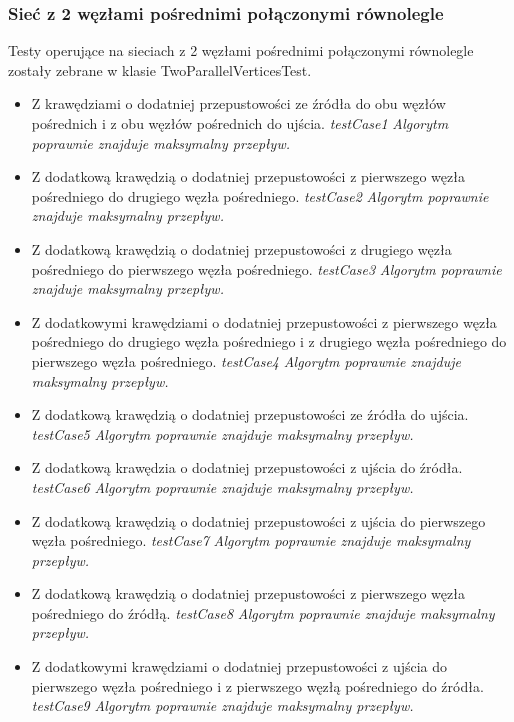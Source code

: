 \subsubsection{Sieć z 2 węzłami pośrednimi połączonymi równolegle}
Testy operujące na sieciach z 2 węzłami pośrednimi połączonymi równolegle zostały
zebrane w klasie TwoParallelVerticesTest.
\begin{itemize}[nosep]
    \item Z krawędziami o dodatniej przepustowości ze źródła do obu węzłów
    pośrednich i z obu węzłów pośrednich do ujścia.
    \emph{testCase1}
    \emph{Algorytm poprawnie znajduje maksymalny przepływ.}

    \item Z dodatkową krawędzią o dodatniej przepustowości z pierwszego węzła
    pośredniego do drugiego węzła pośredniego.
    \emph{testCase2}
    \emph{Algorytm poprawnie znajduje maksymalny przepływ.}

    \item Z dodatkową krawędzią o dodatniej przepustowości z drugiego węzła
    pośredniego do pierwszego węzła pośredniego.
    \emph{testCase3}
    \emph{Algorytm poprawnie znajduje maksymalny przepływ.}

    \item Z dodatkowymi krawędziami o dodatniej przepustowości z pierwszego
    węzła pośredniego do drugiego węzła pośredniego i z drugiego węzła
    pośredniego do pierwszego węzła pośredniego.
    \emph{testCase4}
    \emph{Algorytm poprawnie znajduje maksymalny przepływ.}

    \item Z dodatkową krawędzią o dodatniej przepustowości ze źródła do ujścia.
    \emph{testCase5}
    \emph{Algorytm
    poprawnie znajduje maksymalny przepływ.}

    \item Z dodatkową krawędzia o dodatniej przepustowości z ujścia do źródła.
    \emph{testCase6}
    \emph{Algorytm poprawnie znajduje maksymalny przepływ.}

    \item Z dodatkową krawędzią o dodatniej przepustowości z ujścia do
    pierwszego węzła pośredniego.
    \emph{testCase7}
    \emph{Algorytm poprawnie znajduje maksymalny przepływ.}

    \item Z dodatkową krawędzią o dodatniej przepustowości z pierwszego węzła
    pośredniego do źródłą.
    \emph{testCase8}
    \emph{Algorytm
    poprawnie znajduje maksymalny przepływ.}

    \item Z dodatkowymi krawędziami o dodatniej przepustowości z ujścia do
    pierwszego węzła pośredniego i z pierwszego węzłą pośredniego do źródła.
    \emph{testCase9}
    \emph{Algorytm poprawnie znajduje maksymalny przepływ.}
\end{itemize}


